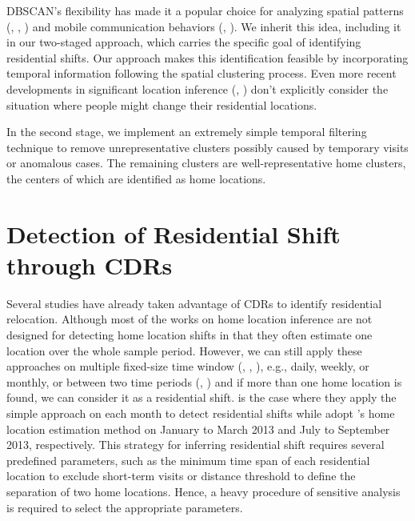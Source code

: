 DBSCAN's flexibility has made it a popular choice for analyzing spatial patterns (\cite{yang2014identifying}, \cite{shi2014density}, \cite{dominguez2017sensing}) and mobile communication behaviors (\cite{karahoca2006comparing}, \cite{jabbar2020fraud}). We inherit this idea, including it in our two-staged approach, which carries the specific goal of identifying residential shifts. Our approach makes this identification feasible by incorporating temporal information following the spatial clustering process. Even more recent developments in significant location inference (\cite{tongsinoot2017exploring}, \cite{luo2020research}) don't explicitly consider the situation where people might change their residential locations.


In the second stage, we implement an extremely simple temporal filtering technique to remove unrepresentative clusters possibly caused by temporary visits or anomalous cases. The remaining clusters are well-representative home clusters, the centers of which are identified as home locations.


\section{Detection of Residential Shift through CDRs}
Several studies have already taken advantage of CDRs to identify residential relocation. Although most of the works on home location inference are not designed for detecting home location shifts in that they often estimate one location over the whole sample period. However, we can still apply these approaches on multiple fixed-size time window (\cite{blumenstock2012inferring}, \cite{phithakkitnukoon2022inferring}, \cite{blumenstock2025migration}), e.g., daily, weekly, or monthly, or between two time periods (\cite{lai2019exploring}, \cite{dias2022framework}) and if more than one home location is found, we can consider it as a residential shift. \cite{phithakkitnukoon2022inferring} is the case where they apply the simple approach on each month to detect residential shifts while \cite{dias2022framework} adopt \cite{isaacman2011identifying}'s home location estimation method on January to March 2013 and July to September 2013, respectively. This strategy for inferring residential shift requires several predefined parameters, such as the minimum time span of each residential location to exclude short-term visits or distance threshold to define the separation of two home locations. Hence, a heavy procedure of sensitive analysis is required to select the appropriate parameters.

